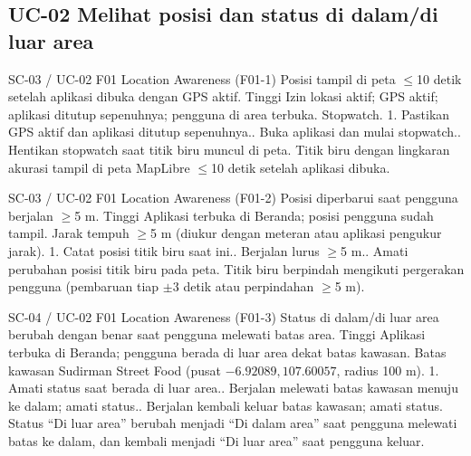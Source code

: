 \subsection*{UC-02 Melihat posisi dan status di dalam/di luar area}

\renewcommand{\tcactual}{Sesuai ekspektasi pada perangkat Android. Titik biru dengan lingkaran akurasi tampil di peta MapLibre \(\le\)10 detik setelah aplikasi dibuka.}
{SC-03 / UC-02}
{F01 Location Awareness}
{(F01-1) Posisi tampil di peta \(\le\)10 detik setelah aplikasi dibuka dengan GPS aktif.}
{Tinggi}
{Izin lokasi aktif; GPS aktif; aplikasi ditutup sepenuhnya; pengguna di area terbuka.}
{Stopwatch.}
{1. Pastikan GPS aktif dan aplikasi ditutup sepenuhnya.. Buka aplikasi dan mulai stopwatch.. Hentikan stopwatch saat titik biru muncul di peta.}
{Titik biru dengan lingkaran akurasi tampil di peta MapLibre \(\le\)10 detik setelah aplikasi dibuka.}

\renewcommand{\tcactual}{Sesuai ekspektasi pada perangkat Android (Logika jarak (\texttt{01-geofence}) lolos). Titik biru berpindah mengikuti pergerakan pengguna (pembaruan tiap \(\pm\)3 detik atau perpindahan \(\ge\)5 m).}
{SC-03 / UC-02}
{F01 Location Awareness}
{(F01-2) Posisi diperbarui saat pengguna berjalan \(\ge\)5 m.}
{Tinggi}
{Aplikasi terbuka di Beranda; posisi pengguna sudah tampil.}
{Jarak tempuh \(\ge\)5 m (diukur dengan meteran atau aplikasi pengukur jarak).}
{1. Catat posisi titik biru saat ini.. Berjalan lurus \(\ge\)5 m.. Amati perubahan posisi titik biru pada peta.}
{Titik biru berpindah mengikuti pergerakan pengguna (pembaruan tiap \(\pm\)3 detik atau perpindahan \(\ge\)5 m).}

\renewcommand{\tcactual}{Sesuai ekspektasi pada perangkat Android (Logika boundary (\texttt{01-geofence}) lolos). Status ``Di luar area'' berubah menjadi ``Di dalam area'' saat pengguna melewati batas ke dalam, dan kembali menjadi ``Di luar area'' saat pengguna keluar.}
{SC-04 / UC-02}
{F01 Location Awareness}
{(F01-3) Status di dalam/di luar area berubah dengan benar saat pengguna melewati batas area.}
{Tinggi}
{Aplikasi terbuka di Beranda; pengguna berada di luar area dekat batas kawasan.}
{Batas kawasan Sudirman Street Food (pusat \(-6.92089, 107.60057\), radius 100 m).}
{1. Amati status saat berada di luar area.. Berjalan melewati batas kawasan menuju ke dalam; amati status.. Berjalan kembali keluar batas kawasan; amati status.}
{Status ``Di luar area'' berubah menjadi ``Di dalam area'' saat pengguna melewati batas ke dalam, dan kembali menjadi ``Di luar area'' saat pengguna keluar.}

